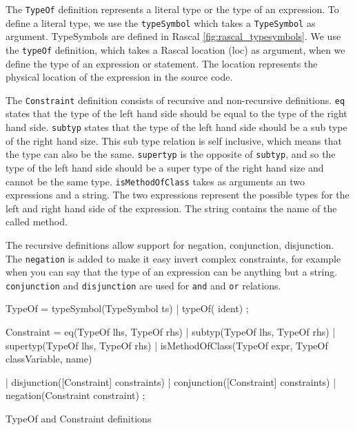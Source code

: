 \documentclass[../main.tex]{subfiles}
\begin{document}
    The \texttt{TypeOf} definition represents a literal type or the type of an expression.
    To define a literal type, we use the \texttt{typeSymbol} which takes a \texttt{TypeSymbol} as argument.
    TypeSymbols are defined in Rascal \ref{fig:rascal_typesymbols}.
    We use the \texttt{typeOf} definition, which takes a Rascal location (loc) as argument, when we define the type of an expression or statement.
    The location represents the physical location of the expression in the source code.
    
    The \texttt{Constraint} definition consists of recursive and non-recursive definitions.
    \texttt{eq} states that the type of the left hand side should be equal to the type of the right hand side.
    \texttt{subtyp} states that the type of the left hand side should be a sub type of the right hand size.
    This sub type relation is self inclusive, which means that the type can also be the same.
    \texttt{supertyp} is the opposite of \texttt{subtyp}, and so the type of the left hand side should be a super type of the right hand size and cannot be the same type.
    \texttt{isMethodOfClass} takes as arguments an two expressions and a string.
    The two expressions represent the possible types for the left and right hand side of the expression.
    The string contains the name of the called method.
    
    The recursive definitions allow support for negation, conjunction, disjunction.
    The \texttt{negation} is added to make it easy invert complex constraints, for example when you can say that the type of an expression can be anything but a string.
    \texttt{conjunction} and \texttt{disjunction} are used for \texttt{and} and \texttt{or} relations.
    
    \begin{program}    
    \begin{rascal}%
 TypeOf
    = typeSymbol(TypeSymbol ts)
    | typeOf( ident)
    ;
        
 Constraint 
    = eq(TypeOf lhs, TypeOf rhs)
    | subtyp(TypeOf lhs, TypeOf rhs)
    | supertyp(TypeOf lhs, TypeOf rhs)
    | isMethodOfClass(TypeOf expr, TypeOf classVariable,  name)
    
    | disjunction([Constraint] constraints)
    | conjunction([Constraint] constraints) 
    | negation(Constraint constraint) 
    ;\end{rascal}%
	
	\caption{TypeOf and Constraint definitions}
	\label{fig:typeof_and_constraint}
	\end{program}
    
\end{document}
